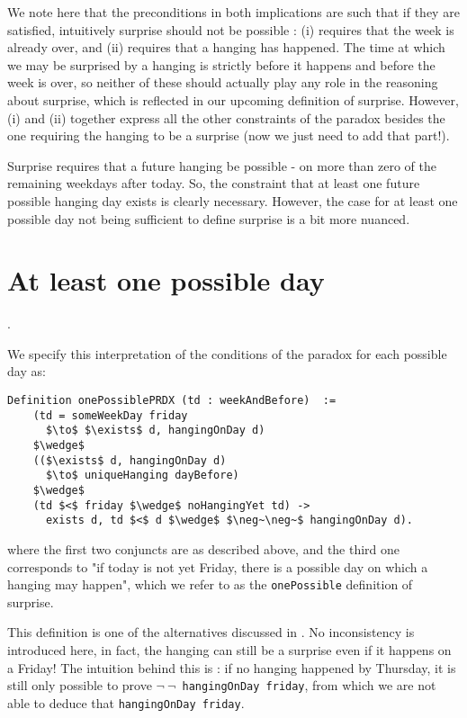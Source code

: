 \documentclass[journal]{journal}
\begin{document}
We note here that the preconditions in both implications are such that if
they are satisfied, intuitively surprise should not be possible : (i)
requires that the week is already over, and (ii) requires that a hanging
has happened. The time at which we may be surprised by a hanging is strictly
before it happens and before the week is over, so neither of these should
actually play any role in the reasoning about surprise, which is reflected
in our upcoming definition of surprise. However, (i) and (ii) together express all the
other constraints of the paradox besides the one requiring the hanging to
be a surprise (now we just need to add that part!).

Surprise requires that a future hanging be possible - on more than zero
of the remaining weekdays after today.
So, the constraint that at least one future possible hanging day exists is
clearly necessary. However, the case for at least one possible day not
being sufficient to define surprise is a bit more nuanced.

\section{At least one possible day}.
\label{sec:one}

We specify this interpretation
of the conditions of the paradox for each possible day as:

\begin{lstlisting}[mathescape=true]
  Definition onePossiblePRDX (td : weekAndBefore)  :=
    (td = someWeekDay friday
      $\to$ $\exists$ d, hangingOnDay d)
    $\wedge$
    (($\exists$ d, hangingOnDay d)
      $\to$ uniqueHanging dayBefore)
    $\wedge$
    (td $<$ friday $\wedge$ noHangingYet td) ->
      exists d, td $<$ d $\wedge$ $\neg~\neg~$ hangingOnDay d).
\end{lstlisting}

where the first two conjuncts are as described above, and
the third one corresponds to "if today is not
  yet Friday, there is a possible day on which a hanging may happen", which
  we refer to as the {\tt onePossible} definition of surprise.

This definition is one of the alternatives discussed in \cite{}. No inconsistency
is introduced here, in fact, the hanging can still be a surprise even if it
happens on a Friday! The intuition behind this is : if no hanging happened by
Thursday, it is still only possible to prove {\tt $\neg~\neg$~hangingOnDay friday},
from which we are not able to deduce that {\tt hangingOnDay friday}.
\end{document}
